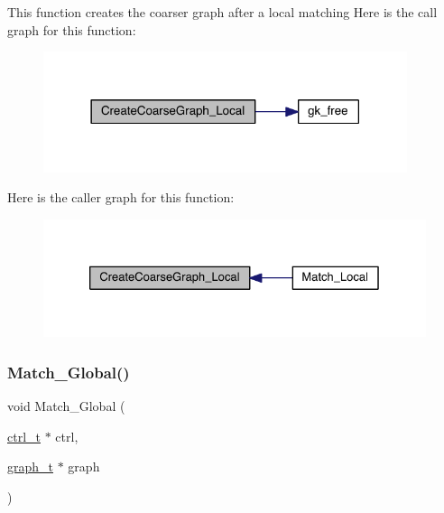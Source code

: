 This function creates the coarser graph after a local matching Here is the call graph for this function\+:\nopagebreak
\begin{figure}[H]
\begin{center}
\leavevmode
\includegraphics[width=302pt]{a00368_a5070c68f093e9635e0f2bc1c8630ba27_cgraph}
\end{center}
\end{figure}
Here is the caller graph for this function\+:\nopagebreak
\begin{figure}[H]
\begin{center}
\leavevmode
\includegraphics[width=326pt]{a00368_a5070c68f093e9635e0f2bc1c8630ba27_icgraph}
\end{center}
\end{figure}
\mbox{\label{a00368_ad37d00e4c0b7fb71a6778c5bf86d4d02}} 
\subsubsection{\texorpdfstring{Match\+\_\+\+Global()}{Match\_Global()}}
{\footnotesize\ttfamily void Match\+\_\+\+Global (\begin{DoxyParamCaption}\item[{\hyperlink{a00742}{ctrl\+\_\+t} $\ast$}]{ctrl,  }\item[{\hyperlink{a00734}{graph\+\_\+t} $\ast$}]{graph }\end{DoxyParamCaption})}

